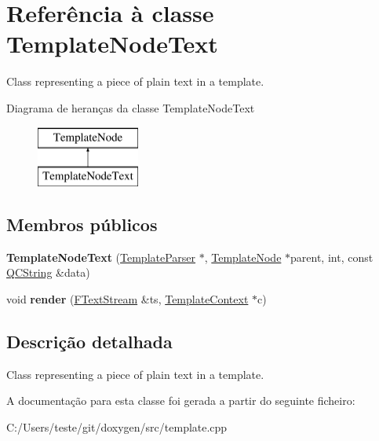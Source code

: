 \hypertarget{class_template_node_text}{\section{Referência à classe Template\-Node\-Text}
\label{class_template_node_text}
}


Class representing a piece of plain text in a template.  


Diagrama de heranças da classe Template\-Node\-Text\begin{figure}[H]
\begin{center}
\leavevmode
\includegraphics[height=2.000000cm]{class_template_node_text}
\end{center}
\end{figure}
\subsection*{Membros públicos}
\begin{DoxyCompactItemize}
\item 
\hypertarget{class_template_node_text_ac052c9a192a70f68ea48da7db70b752d}{{\bfseries Template\-Node\-Text} (\hyperlink{class_template_parser}{Template\-Parser} $\ast$, \hyperlink{class_template_node}{Template\-Node} $\ast$parent, int, const \hyperlink{class_q_c_string}{Q\-C\-String} \&data)}\label{class_template_node_text_ac052c9a192a70f68ea48da7db70b752d}

\item 
\hypertarget{class_template_node_text_aaa6575d8c79eeaa49f849f1ca1d6b228}{void {\bfseries render} (\hyperlink{class_f_text_stream}{F\-Text\-Stream} \&ts, \hyperlink{class_template_context}{Template\-Context} $\ast$c)}\label{class_template_node_text_aaa6575d8c79eeaa49f849f1ca1d6b228}

\end{DoxyCompactItemize}


\subsection{Descrição detalhada}
Class representing a piece of plain text in a template. 

A documentação para esta classe foi gerada a partir do seguinte ficheiro\-:\begin{DoxyCompactItemize}
\item 
C\-:/\-Users/teste/git/doxygen/src/template.\-cpp\end{DoxyCompactItemize}
